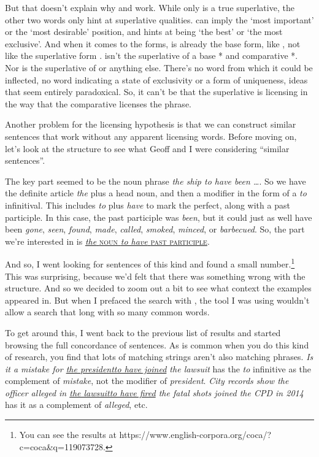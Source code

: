 But that doesn't explain why  and  work. While only  is a true superlative, the other two words only hint at superlative qualities.  can imply the `most important' or the `most desirable' position, and  hints at being `the best' or `the most exclusive'. And when it comes to the forms,  is already the base form, like , not like the superlative form .  isn't the superlative of a base * and comparative *. Nor is  the superlative of  or anything else. There's no word from which it could be inflected, no word indicating a state of  exclusivity or a  form of uniqueness, ideas that seem entirely paradoxical. So, it can't be that the superlative is licensing  in the way that the comparative licenses the  phrase.

Another problem for the licensing hypothesis is that we can construct similar sentences that work without any apparent licensing words. Before moving on, let's look at the structure to see what Geoff and I were considering \enquote{similar sentences}.

The key part seemed to be the noun phrase \textit{the ship to have been \dots}. So we have the definite article \textit{the} plus a head noun, and then a modifier in the form of a \textit{to} infinitival. This includes \textit{to} plus \textit{have} to mark the perfect, along with a past participle. In this case, the past participle was \textit{been}, but it could just as well have been \textit{gone}, \textit{seen}, \textit{found}, \textit{made}, \textit{called}, \textit{smoked}, \textit{minced}, or \textit{barbecued}. So, the part we're interested in is \uline{\textit{the} \textsc{noun} \textit{to have} \textsc{past participle}}.

And so, I went looking for sentences of this kind and found a small number.\footnote{You can see the results at https://www.english-corpora.org/coca/?c=coca\&q=119073728.} This was surprising, because we'd felt that there was something wrong with the structure. And so we decided to zoom out a bit to see what context the examples appeared in. But when I prefaced the search with , the tool I was using wouldn't allow a search that long with so many common words.

To get around this, I went back to the previous list of results and started browsing the full concordance of sentences. As is common when you do this kind of research, you find that lots of matching strings aren't also matching phrases. \textit{Is it a mistake \ob for \uline{the president\cb to have joined} the lawsuit} has the \textit{to} infinitive as the complement of \textit{mistake}, not the modifier of \textit{president}. \textit{City records show the officer alleged \ob in \uline{the lawsuit\cb to have fired} the fatal shots joined the CPD in 2014} has it as a complement of \textit{alleged}, etc.

